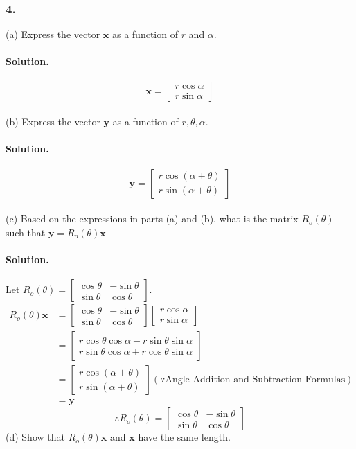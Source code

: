 \subsubsection{4.}
(a) Express the vector $\mathbf{x}$ as a function of $r$ and $\alpha$.
\paragraph{Solution.}
$$\mathbf{x} = \begin{bmatrix}
    r\cos\alpha\\r\sin\alpha
\end{bmatrix}$$\\

(b) Express the vector $\mathbf{y}$ as a function of $r,\theta,\alpha$.
\paragraph{Solution.}
$$\mathbf{y} = \begin{bmatrix}
    r\cos(\alpha+\theta)\\r\sin(\alpha+\theta)
\end{bmatrix}$$\\

(c) Based on the expressions in parts (a) and (b), what is the matrix $R_o(\theta)$ such that $\mathbf{y}=R_o(\theta)\mathbf{x}$
\paragraph{Solution.}
Let $R_o(\theta) = \begin{bmatrix}
    \cos\theta & -\sin\theta\\
    \sin\theta & \cos\theta
\end{bmatrix}$.
\begin{align*}
    R_o(\theta)\mathbf{x} &= \begin{bmatrix}
        \cos\theta & -\sin\theta\\
        \sin\theta & \cos\theta
    \end{bmatrix} \begin{bmatrix}
        r\cos\alpha\\r\sin\alpha
    \end{bmatrix}\\
    &= \begin{bmatrix}
        r\cos\theta\cos\alpha - r\sin\theta\sin\alpha\\
        r\sin\theta\cos\alpha + r\cos\theta\sin\alpha
    \end{bmatrix}\\
    &= \begin{bmatrix}
        r\cos(\alpha+\theta)\\r\sin(\alpha+\theta)
    \end{bmatrix} (\because \text{Angle Addition and Subtraction Formulas})\\
    &= \mathbf{y}
\end{align*}
$$\therefore R_o(\theta) = \begin{bmatrix}
    \cos\theta & -\sin\theta\\
    \sin\theta & \cos\theta
\end{bmatrix}$$
\newpage
(d) Show that $R_o(\theta)\mathbf{x}$ and $\mathbf{x}$ have the same length.

